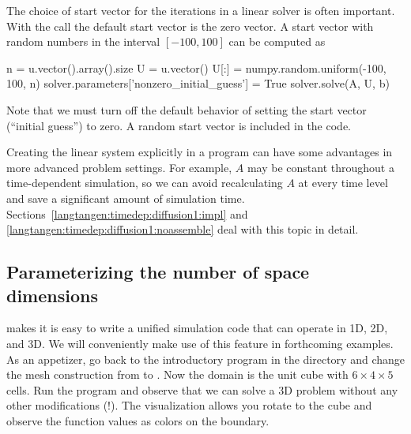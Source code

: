 The choice of start vector for the iterations in a linear solver is often
important. With the  call the default start vector
is the zero vector. A start vector
with random numbers in the interval $[-100,100]$ can be computed as
\begin{python}
n = u.vector().array().size
U = u.vector()
U[:] = numpy.random.uniform(-100, 100, n)
solver.parameters['nonzero_initial_guess'] = True
solver.solve(A, U, b)
\end{python}
Note that we must turn off the default behavior of setting the start
vector (``initial guess'') to zero.
A random start vector is included in the  code.

Creating the linear system explicitly in a program can have some
advantages in more advanced problem settings. For example, $A$ may
be constant throughout a time-dependent simulation, so we can avoid
recalculating $A$ at every time level and save a significant amount
of simulation time.  Sections~\ref{langtangen:timedep:diffusion1:impl}
and \ref{langtangen:timedep:diffusion1:noassemble} deal with this topic
in detail.



\subsection{Parameterizing the number of space dimensions}
\label{langtangen:poisson:nD}

\fenics{} makes it is easy to write a unified simulation code that can operate
in 1D, 2D, and 3D. We will conveniently make use of this feature in
forthcoming examples.
As an appetizer, go back to the introductory program 
in the  directory and change the mesh construction
from  to . Now the domain
is the unit cube with $6\times 4\times 5$ cells.
Run the program and observe that we can solve a 3D problem without
any other modifications (!). The visualization allows you rotate to the
cube and observe the function values as colors on the boundary.


